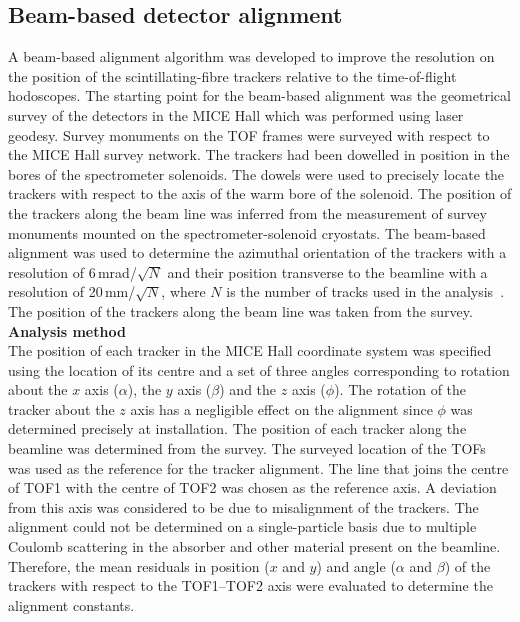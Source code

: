


\subsection{Beam-based detector alignment}
\label{SubSect:DA}

A beam-based alignment algorithm was developed to improve the
resolution on the position of the scintillating-fibre trackers
relative to the time-of-flight hodoscopes.
The starting point for the beam-based alignment was the geometrical
survey of the detectors in the MICE Hall which was performed using
laser geodesy. 
Survey monuments on the TOF frames were surveyed with respect to the
MICE Hall survey network.
The trackers had been dowelled in position in the bores of the
spectrometer solenoids.
The dowels were used to precisely locate the trackers with respect to
the axis of the warm bore of the solenoid.
The position of the trackers along the beam line was inferred from the
measurement of survey monuments mounted on the spectrometer-solenoid
cryostats.
The beam-based alignment was used to determine the azimuthal
orientation of the trackers with a resolution of 6\,mrad/$\sqrt{N}$
and their position transverse to the beamline with a resolution of
20\,mm/$\sqrt{N}$, where $N$ is the number of tracks used in the
analysis~\cite{2018arXiv1805.06623T}.
The position of the trackers along the beam line was taken from the
survey. \\

\noindent\textbf{Analysis method} \\
\label{SubSect:DA_Analysis}
\noindent The position of each tracker in the MICE Hall coordinate
system was specified using the location of its centre and a set of
three angles corresponding to rotation about the $x$ axis ($\alpha$),
the $y$ axis ($\beta$) and the $z$ axis ($\phi$).
The rotation of the tracker about the $z$ axis has a negligible effect
on the alignment since $\phi$ was determined precisely
at installation.
The position of each tracker along the beamline was determined from
the survey.
The surveyed location of the TOFs was used as the reference for the
tracker alignment.
The line that joins the centre of TOF1 with the centre of TOF2 was
chosen as the reference axis.
A deviation from this axis was considered to be due to misalignment
of the trackers.
The alignment could not be determined on a single-particle basis due
to multiple Coulomb scattering in the absorber and other material
present on the beamline.
Therefore, the mean residuals in position ($x$ and $y$) and angle
($\alpha$ and $\beta$) of the trackers with respect to the TOF1--TOF2
axis were evaluated to determine the alignment constants.

